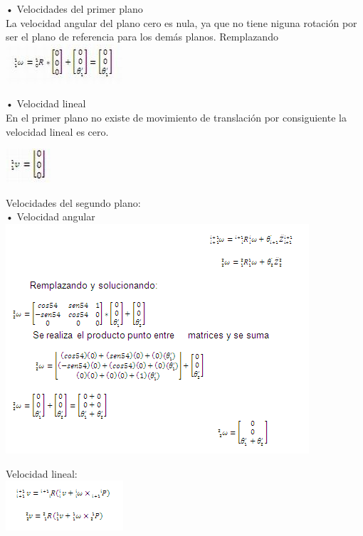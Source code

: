\documentclass[12pt,a4paper]{report}
\begin{document}
•	Velocidades del primer plano\\
La velocidad angular del plano cero es nula, ya que no tiene niguna rotación por ser el plano de referencia para los demás planos. Remplazando
\vspace{25mm} %
 \hspace{1cm}\hspace{1cm} \includegraphics{ecuacion1.jpg}
 

•	Velocidad lineal\\
En el primer plano no existe de movimiento de translación por consiguiente la velocidad lineal es cero.

 \hspace{6cm} \includegraphics{ecuacion2.jpg}

  
Velocidades del segundo plano:\\
•	Velocidad angular\\

   \hspace{2cm}  \includegraphics{ecuacion3.png}
   
   
Velocidad lineal:\\

   \hspace{5cm} \includegraphics{ecuacion4.png}\\
   
\end{document}
